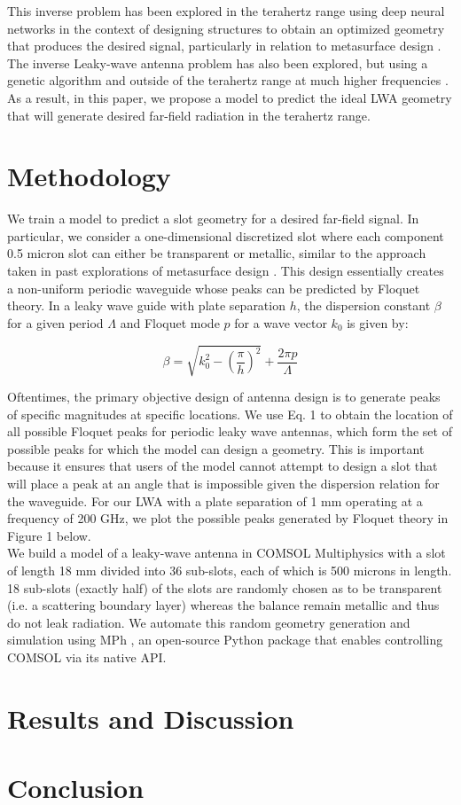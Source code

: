 \documentclass[11pt]{article}
\begin{document}
\noindent This inverse problem has been explored in the terahertz range using deep neural networks in the context of designing structures to obtain an optimized geometry that produces the desired signal, particularly in relation to metasurface design \cite{Deng:21, 9602997}. The inverse Leaky-wave antenna problem has also been explored, but using a genetic algorithm and outside of the terahertz range at much higher frequencies \cite{Jafar-Zanjani:2018vy}. As a result, in this paper, we propose a model to predict the ideal LWA geometry that will generate desired far-field radiation in the terahertz range.

\section*{Methodology}

We train a model to predict a slot geometry for a desired far-field signal. In particular, we consider a one-dimensional discretized slot where each component 0.5 micron slot can either be transparent or metallic, similar to the approach taken in past explorations of metasurface design \cite{Jafar-Zanjani:2018vy}. This design essentially creates a non-uniform periodic waveguide whose peaks can be predicted by Floquet theory. In a leaky wave guide with plate separation $h$, the dispersion constant $\beta$ for a given period $\Lambda$ and Floquet mode $p$ for a wave vector $k_0$ is given by:

\[\beta=\sqrt{k_0^2 - (\frac{\pi}{h})^2} +\frac{2\pi p}{\Lambda} \tag{1} \label{eq:special}\] 

\noindent Oftentimes, the primary objective design of antenna design is to generate peaks of specific magnitudes at specific locations. We use Eq. 1 to  obtain the location of all possible Floquet peaks for periodic leaky wave antennas, which form the set of possible peaks for which the model can design a geometry. This is important because it ensures that users of the model cannot attempt to design a slot that will place a peak at an angle that is impossible given the dispersion relation for the waveguide. For our LWA with a plate separation of 1 mm operating at a frequency of 200 GHz, we plot the possible peaks generated by Floquet theory in Figure 1 below. \\

\noindent We build a model of a leaky-wave antenna in COMSOL Multiphysics with a slot of length 18 mm divided into 36 sub-slots, each of which is 500 microns in length. 18 sub-slots (exactly half) of the slots are randomly chosen as to be transparent (i.e. a scattering boundary layer) whereas the balance remain metallic and thus do not leak radiation. We automate this random geometry generation and simulation using MPh \cite{john_hennig_2022_6312347}, an open-source Python package that enables controlling COMSOL via its native API.

\section*{Results and Discussion}

\section*{Conclusion}



\end{document}
